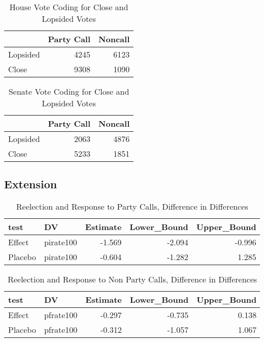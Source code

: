 \documentclass[12pt]{article}
\begin{document}
\begin{table}[H]
	\centering
	\caption{House Vote Coding for Close and Lopsided Votes} 
	\begin{tabular}{lrr}
		\hline
		& Party Call & Noncall \\ 
		\hline
		Lopsided & 4245 & 6123 \\ 
		Close & 9308 & 1090 \\ 
		\hline
	\end{tabular}
\end{table}

\begin{table}[H]
	\centering
	\caption{Senate Vote Coding for Close and Lopsided Votes} 
	\begin{tabular}{lrr}
		\hline
		& Party Call & Noncall \\ 
		\hline
		Lopsided & 2063 & 4876 \\ 
		Close & 5233 & 1851 \\ 
		\hline
	\end{tabular}
\end{table}

 

\subsection{Extension}

\begin{table}[H]
	\centering
	\caption{Reelection and Response to Party Calls, Difference in Differences} 
	\begin{tabular}{llrrr}
		\hline
		test & DV & Estimate & Lower\_Bound & Upper\_Bound \\ 
		\hline
		Effect & pirate100 & -1.569 & -2.094 & -0.996 \\ 
		Placebo & pirate100 & -0.604 & -1.282 & 1.285 \\ 
		\hline
	\end{tabular}
\end{table}

\begin{table}[H]
	\centering
	\caption{Reelection and Response to Non Party Calls, Difference in Differences} 
	\begin{tabular}{llrrr}
		\hline
		test & DV & Estimate & Lower\_Bound & Upper\_Bound \\ 
		\hline
		Effect & pfrate100 & -0.297 & -0.735 & 0.138 \\ 
		Placebo & pfrate100 & -0.312 & -1.057 & 1.067 \\ 
		\hline
	\end{tabular}
\end{table}
\end{document}
